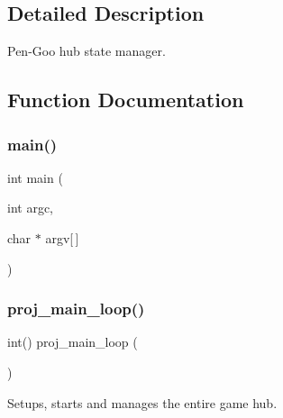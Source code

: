 \subsection{Detailed Description}
Pen-\/\+Goo hub state manager. 

\subsection{Function Documentation}
\mbox{\label{group__proj_ga0ddf1224851353fc92bfbff6f499fa97}} 
\subsubsection{\texorpdfstring{main()}{main()}}
{\footnotesize\ttfamily int main (\begin{DoxyParamCaption}\item[{int}]{argc,  }\item[{char $\ast$}]{argv\mbox{[}$\,$\mbox{]} }\end{DoxyParamCaption})}

\mbox{\label{group__proj_ga33bde23e0d2bbde847401c5ac6fb62e0}} 
\subsubsection{\texorpdfstring{proj\+\_\+main\+\_\+loop()}{proj\_main\_loop()}}
{\footnotesize\ttfamily int() proj\+\_\+main\+\_\+loop (\begin{DoxyParamCaption}{ }\end{DoxyParamCaption})}



Setups, starts and manages the entire game hub. 

